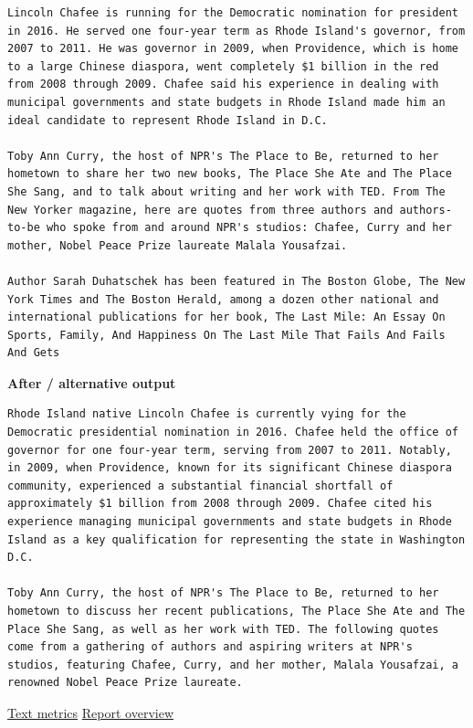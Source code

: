 \begin{Verbatim}
Lincoln Chafee is running for the Democratic nomination for president in 2016. He served one four-year term as Rhode Island's governor, from 2007 to 2011. He was governor in 2009, when Providence, which is home to a large Chinese diaspora, went completely $1 billion in the red from 2008 through 2009. Chafee said his experience in dealing with municipal governments and state budgets in Rhode Island made him an ideal candidate to represent Rhode Island in D.C.

Toby Ann Curry, the host of NPR's The Place to Be, returned to her hometown to share her two new books, The Place She Ate and The Place She Sang, and to talk about writing and her work with TED. From The New Yorker magazine, here are quotes from three authors and authors-to-be who spoke from and around NPR's studios: Chafee, Curry and her mother, Nobel Peace Prize laureate Malala Yousafzai.

Author Sarah Duhatschek has been featured in The Boston Globe, The New York Times and The Boston Herald, among a dozen other national and international publications for her book, The Last Mile: An Essay On Sports, Family, And Happiness On The Last Mile That Fails And Fails And Gets
\end{Verbatim}

\textbf{After / alternative output}

\begin{Verbatim}
Rhode Island native Lincoln Chafee is currently vying for the Democratic presidential nomination in 2016. Chafee held the office of governor for one four-year term, serving from 2007 to 2011. Notably, in 2009, when Providence, known for its significant Chinese diaspora community, experienced a substantial financial shortfall of approximately $1 billion from 2008 through 2009. Chafee cited his experience managing municipal governments and state budgets in Rhode Island as a key qualification for representing the state in Washington D.C.

Toby Ann Curry, the host of NPR's The Place to Be, returned to her hometown to discuss her recent publications, The Place She Ate and The Place She Sang, as well as her work with TED. The following quotes come from a gathering of authors and aspiring writers at NPR's studios, featuring Chafee, Curry, and her mother, Malala Yousafzai, a renowned Nobel Peace Prize laureate.
\end{Verbatim}

\href{records/docs/watermarking/text.tex}{Text metrics} \textbar{}
\href{../docs/watermarking/README.md}{Report overview}
